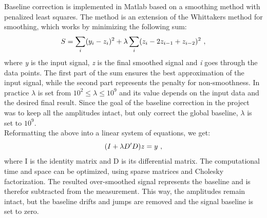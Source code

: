 \documentclass{article}
\begin{document}
{\begin{figure}[h!]
\end{figure}
\\
\\
Baseline correction is implemented in Matlab based on a smoothing method with penalized least squares\cite{ref4}. The method is an extension of the Whittakers method for smoothing, which works by minimizing the following sum: 
\begin{equation}
S=\sum_{i} (y_i - z_i)^2 + \lambda\sum_{i} (z_i - 2z_{i-1} + z_{i-2})^2\thinspace \thinspace ,
\end{equation}
where \textit{y} is the input signal, \textit{z} is the final smoothed signal and \textit{i} goes through the data points.
The first part of the sum ensures the best approximation of the input signal, while the second part represents the penalty for non-smoothness. 
In practice $\lambda$ is set from $ 10^{2} \leq \lambda \leq 10^{9}$ and its value depends on the input data and the desired final result. Since the goal of the baseline correction in the project was to keep all the amplitudes intact, but only correct the global baseline, $\lambda$ is set to $10^{9}$.
\\
Reformatting the above into a linear system of equations, we get:
\begin{equation}
(I + \lambda D'D)z = y\thinspace \thinspace ,
\end{equation}
where I is the identity matrix and D is its differential matrix. 
The computational time and space can be optimized, using sparse matrices and Cholesky factorization. The resulted over-smoothed signal represents the baseline and is therefor subtracted from the measurement. This way, the amplitudes remain intact, but the baseline drifts and jumps are removed and the signal baseline is set to zero. 
}
\end{document}
